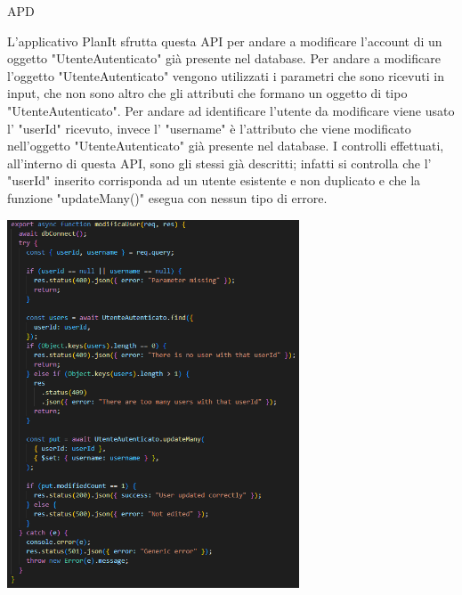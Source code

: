 \begin{listaPersonale} {APD}
\begin{listaPersonale2}[APD]{}
\begin{center}
                \end{center}
                \newpage
                L'applicativo PlanIt sfrutta questa API per andare a modificare l'account di un oggetto "UtenteAutenticato" già presente nel database. Per andare a modificare l'oggetto "UtenteAutenticato" vengono utilizzati i parametri che sono ricevuti in input, che non sono altro che gli attributi che formano un oggetto di tipo "UtenteAutenticato". Per andare ad identificare l'utente da modificare viene usato l' "userId" ricevuto, invece l' "username" è l'attributo che viene modificato nell'oggetto "UtenteAutenticato" già presente nel database. I controlli effettuati, all'interno di questa API, sono gli stessi già descritti; infatti si controlla che l' "userId" inserito corrisponda ad un utente esistente e non duplicato e che la funzione "updateMany()" esegua con nessun tipo di errore.
                \begin{center}
                    \includegraphics[width=0.65\textwidth, height=0.55\textheight]{img/png/APIs/modificaUser.png}
                \end{center}

\end{listaPersonale2}
\end{listaPersonale}
